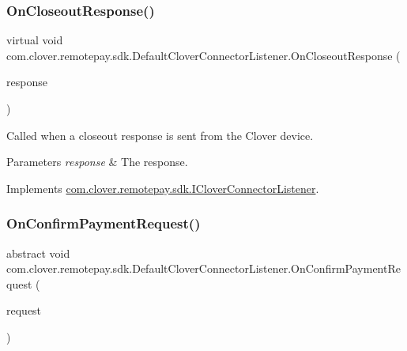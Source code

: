 \subsubsection{\texorpdfstring{On\+Closeout\+Response()}{OnCloseoutResponse()}}
{\footnotesize\ttfamily virtual void com.\+clover.\+remotepay.\+sdk.\+Default\+Clover\+Connector\+Listener.\+On\+Closeout\+Response (\begin{DoxyParamCaption}\item[{\hyperlink{classcom_1_1clover_1_1remotepay_1_1sdk_1_1_closeout_response}{Closeout\+Response}}]{response }\end{DoxyParamCaption})\hspace{0.3cm}{\ttfamily [virtual]}}



Called when a closeout response is sent from the Clover device. 


\begin{DoxyParams}{Parameters}
{\em response} & The response.\\
\hline
\end{DoxyParams}


Implements \hyperlink{interfacecom_1_1clover_1_1remotepay_1_1sdk_1_1_i_clover_connector_listener_a8558c8169f271fa5b26994be50464fb6}{com.\+clover.\+remotepay.\+sdk.\+I\+Clover\+Connector\+Listener}.

\mbox{\label{classcom_1_1clover_1_1remotepay_1_1sdk_1_1_default_clover_connector_listener_ae3a107836a054cedfac615a5fbe72469}} 
\subsubsection{\texorpdfstring{On\+Confirm\+Payment\+Request()}{OnConfirmPaymentRequest()}}
{\footnotesize\ttfamily abstract void com.\+clover.\+remotepay.\+sdk.\+Default\+Clover\+Connector\+Listener.\+On\+Confirm\+Payment\+Request (\begin{DoxyParamCaption}\item[{\hyperlink{classcom_1_1clover_1_1remotepay_1_1sdk_1_1_confirm_payment_request}{Confirm\+Payment\+Request}}]{request }\end{DoxyParamCaption})\hspace{0.3cm}{\ttfamily [pure virtual]}}



